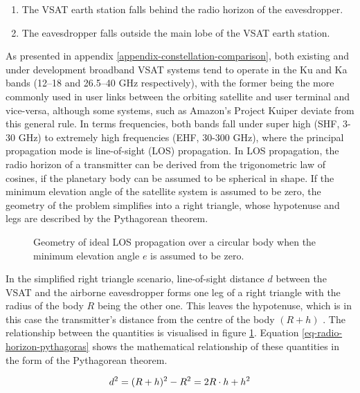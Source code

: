 \documentclass[english, 12pt, a4paper, elec, utf8, a-1b, online]{aaltothesis}
\begin{document}
\begin{enumerate}
  \item The VSAT earth station falls behind the radio horizon of the eavesdropper.
  \item The eavesdropper falls outside the main lobe of the VSAT earth station.
\end{enumerate}

As presented in appendix \ref{appendix-constellation-comparison}, both existing and under development broadband VSAT systems tend to operate in the Ku and Ka bands (12--18 and 26.5--40 GHz respectively), with the former being the more commonly used in user links between the orbiting satellite and user terminal and vice-versa, although some systems, such as Amazon's Project Kuiper deviate from this general rule.
In terms frequencies, both bands fall under super high (SHF, 3-30 GHz) to extremely high frequencies (EHF, 30-300 GHz), where the principal propagation mode is line-of-sight (LOS) propagation.
In LOS propagation, the radio horizon of a transmitter can be derived from the trigonometric law of cosines, if the planetary body can be assumed to be spherical in shape. If the minimum elevation angle of the satellite system is assumed to be zero, the geometry of the problem simplifies into a right triangle, whose hypotenuse and legs are described by the Pythagorean theorem.

\begin{figure}[h]
  \centering
  
  \caption{Geometry of ideal LOS propagation over a circular body \cite{seybold2005introduction} when the minimum elevation angle $e$ is assumed to be zero.}
  \label{fig-interception-range-vacuum}
\end{figure}

In the simplified right triangle scenario, line-of-sight distance $d$ between the VSAT and the airborne eavesdropper forms one leg of a right triangle with the radius of the body $R$ being the other one. This leaves the hypotenuse, which is in this case the transmitter's distance from the centre of the body $(R+h)$ \cite{seybold2005introduction}.
The relationship between the quantities is visualised in figure \ref{fig-interception-range-vacuum}. Equation \ref{eq-radio-horizon-pythagoras} shows the mathematical relationship of these quantities in the form of the Pythagorean theorem.

\begin{equation} \label{eq-radio-horizon-pythagoras}
  d^2=(R+h)^{2}-R^2= 2R \cdot h + h^2 \\
\end{equation}
\end{document}
